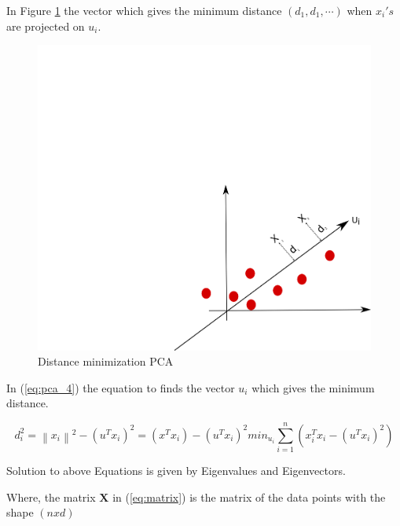 In Figure \ref{fig:pca_step3} the vector which gives the minimum distance $(d_1,d_1, \cdots)$ when $x_i's$ are projected on $u_i$. 

\begin{figure}[H]
\centering
\includegraphics[scale=0.7]{imagens/pca3.png}
\caption{Distance minimization PCA}
\label{fig:pca_step3}
\end{figure}

In (\ref{eq:pca_4}) the equation to finds the vector $u_i$ which gives the minimum distance. 

\begin{subequations}
    \label{eq:pca_4}
    \begin{equation}
        d_i^2 = \left \| x_i \right \|^2 - \left ( u^Tx_i \right )^2
    \end{equation}
    \begin{equation}
        = \left ( x^Tx_i \right ) - (u^Tx_i)^2
    \end{equation}
    \begin{equation}
        min_{u_i} \sum_{i=1}^{n}\left ( x_i^Tx_i - \left ( u^Tx_i \right )^2 \right )
    \end{equation}
\end{subequations}

Solution to above Equations is given by Eigenvalues and Eigenvectors. 

Where, the matrix $\mathbf{X}$ in (\ref{eq:matrix}) is the matrix of the data points with the shape $(n x d)$

